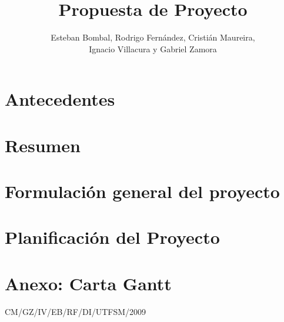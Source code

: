 \documentclass[12pt,letterpaper]{article}
\title{Propuesta de Proyecto}
\author{Esteban Bombal, Rodrigo Fernández, Cristián Maureira,\\Ignacio Villacura y Gabriel Zamora}
\begin{document}

\maketitle\thispagestyle{empty}

\section{Antecedentes}
\label{op:antecedentes}

\newpage

\section{Resumen}
\label{target:resumen}

\newpage

\section{Formulación general del proyecto}
\label{team:formulacion}

\newpage

\section{Planificación del Proyecto}
\label{prod:planificacion}

\newpage

\section{Anexo: Carta Gantt}



\vfill \hfill CM/GZ/IV/EB/RF/DI/UTFSM/2009
\end{document}
